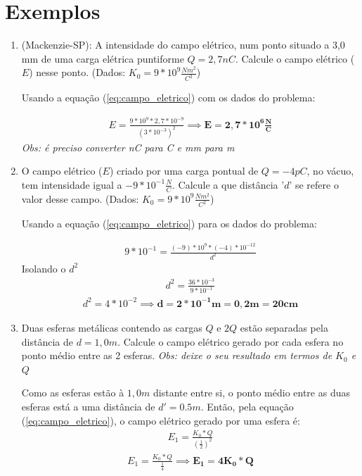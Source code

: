 \documentclass[12pt]{extarticle}
\newcommand{\<}{\langle}
\renewcommand{\>}{\rangle}
\theoremstyle{definition}
\begin{document}
 \section{Exemplos}
 \begin{enumerate}
     \item 
     (Mackenzie-SP): A intensidade do campo elétrico, num ponto situado a 3,0 mm de uma carga elétrica puntiforme $Q = 2,7 nC$. Calcule o campo elétrico ($E$) nesse ponto. (Dados: $K_{0} = 9*10^{9}\frac{Nm^{2}}{C^{2}}$) 
     
     Usando a equação (\ref{eq:campo_eletrico}) com os dados do problema:
     
     \begin{align*}
         E = \frac{9*10^{9}*2,7*10^{-9}}{(3*10^{-3})^{2}} \implies \mathbf{E = 2,7*10^{6} \frac{N}{C}}
     \end{align*}
     \textit{Obs: é preciso converter nC para C e mm para m}
     \item
     O campo elétrico ($E$) criado por uma carga pontual de $Q= -4 pC$, no vácuo, tem intensidade igual a $-9*10^{-1} \frac{N}{C}$. Calcule a que distância '$d$' se refere o valor desse campo. (Dados: $K_{0}= 9*10^{9} \frac{Nm^2}{C^2}$)
     
     Usando a equação (\ref{eq:campo_eletrico}) para os dados do problema:
     
     \begin{align*}
         9*10^{-1} = \frac{(-9)*10^{9}*(-4)*10^{-12}}{d^{2}}
     \end{align*}
     Isolando o $d^{2}$
     \begin{align*}
         d^{2} = \frac{36*10^{-3}}{9*10^{-1}}
     \end{align*}
     \begin{align*}
         d^{2}= 4*10^{-2} \implies \mathbf{d= 2*10^{-1}m = 0,2m = 20 cm}
     \end{align*}
     
     \item
     Duas esferas metálicas contendo as cargas $Q$ e $2Q$ estão separadas pela distância de $d=1,0 m$. Calcule o campo elétrico gerado por cada esfera no ponto médio entre as 2 esferas. \textit{Obs: deixe o seu resultado em termos de $K_{0}$ e $Q$}
     
     Como as esferas estão à $1,0m$ distante entre si, o ponto médio entre as duas esferas está a uma distância de $d' = 0.5m$. Então, pela equação (\ref{eq:campo_eletrico}), o campo elétrico gerado por uma esfera é:
     \begin{align*}
         E_{1} = \frac{K_{0}*Q}{(\frac{1}{2})^{2}}
     \end{align*}
     \begin{align*}
         E_{1} = \frac{K_{0}*Q}{\frac{1}{4}} \implies \mathbf{E_{1}=4K_{0}*Q}
     \end{align*}
     

\end{enumerate}
\end{document}

